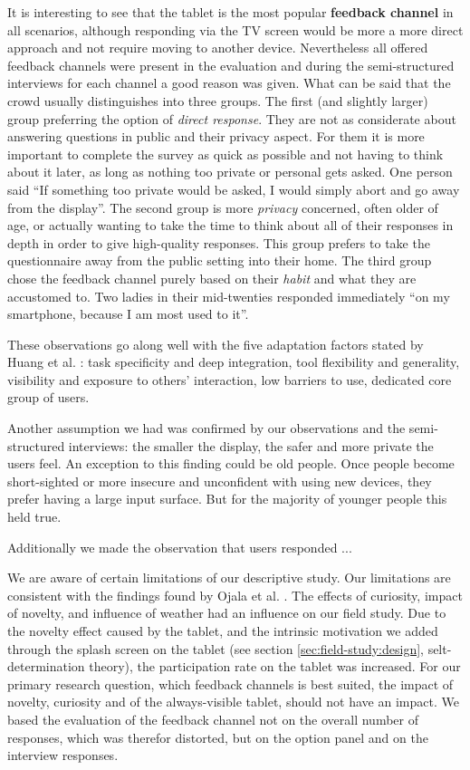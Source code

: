 	
	It is interesting to see that the tablet is the most popular \textbf{feedback channel} in all scenarios, although responding via the TV screen would be more a more direct approach and not require moving to another device. 
	Nevertheless all offered feedback channels were present in the evaluation and during the semi-structured interviews for each channel a good reason was given. What can be said that the crowd usually distinguishes into three groups. The first (and slightly larger) group preferring the option of \textit{direct response}. They are not as considerate about answering questions in public and their privacy aspect. For them it is more important to complete the survey as quick as possible and not having to think about it later, as long as nothing too private or personal gets asked. One person said ``If something too private would be asked, I would simply abort and go away from the display''. The second group is more \textit{privacy} concerned, often older of age, or actually wanting to take the time to think about all of their responses in depth in order to give high-quality responses. This group prefers to take the questionnaire away from the public setting into their home. The third group chose the feedback channel purely based on their \textit{habit} and what they are accustomed to. Two ladies in their mid-twenties responded immediately ``on my smartphone, because I am most used to it''.

	These observations go along well with the five adaptation factors stated by Huang et al. \cite{Huang2004}: task specificity and deep integration, tool flexibility and generality, visibility and exposure to others' interaction, low barriers to use, dedicated core group of users.

	Another assumption we had was confirmed by our observations and the semi-structured interviews: the smaller the display, the safer and more private the users feel. An exception to this finding could be old people. Once people become short-sighted or more insecure and unconfident with using new devices, they prefer having a large input surface. But for the majority of younger people this held true.

	Additionally we made the observation that users responded ...
	




	We are aware of certain limitations of our descriptive study. Our limitations are consistent with the findings found by Ojala et al. \cite{Ojala2011}. The effects of curiosity, impact of novelty, and influence of weather had an influence on our field study. Due to the novelty effect caused by the tablet, and the intrinsic motivation we added through the splash screen on the tablet (see section \ref{sec:field-study:design}, selt-determination theory), the participation rate on the tablet was increased. For our primary research question, which feedback channels is best suited, the impact of novelty, curiosity and of the always-visible tablet, should not have an impact. We based the evaluation of the feedback channel not on the overall number of responses, which was therefor distorted, but on the option panel and on the interview responses.

